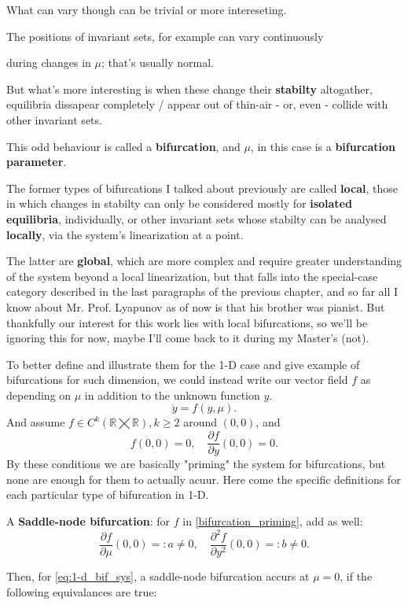 What can vary though can be trivial or more intereseting.

The positions of invariant sets, for example can vary continuously

during changes in $\mu$; that's usually normal.

But what's more interesting is when these change their \textbf{stabilty} altogather, equilibria dissapear completely / appear out of thin-air - or, even - collide with other invariant sets.

This odd behaviour is called a \textbf{bifurcation}, and $\mu$, in this case is a \textbf{bifurcation parameter}.

The former types of bifurcations I talked about previously are called \textbf{local}, those in which changes in stabilty can only be considered mostly for \textbf{isolated equilibria}, individually, or other invariant sets whose stabilty can be analysed \textbf{locally}, via the system's linearization at a point.

The latter are \textbf{global}, which are more complex and require greater understanding of the system beyond a local linearization, but that falls into the special-case category described in the last paragraphs of the previous chapter, and so far all I know about Mr. Prof. Lyapunov as of now is that his brother was pianist. But thankfully our interest for this work lies with local bifurcations, so we'll be ignoring this for now, maybe I'll come back to it during my Master's (not).

To better define and illustrate them for the 1-D case and give example of bifurcations for such dimension, we could instead write our vector field $f$ as depending on $\mu$ in addition to the unknown function $y$.
\begin{equation}\label{eq:1-d_bif_sys}
  \dot{y} = f(y, \mu).
\end{equation}
And assume $f \in C^k(\mathbb{R} \bigtimes \mathbb{R}), k \geq 2 $ around $(0,0)$, and
\begin{equation}\label{bifurcation_priming}
  f(0,0) = 0, \quad \frac{\partial f}{\partial y}(0,0) = 0.
\end{equation}
By these conditions we are basically "priming" the system for bifurcations, but none are enough for them to actually acuur. Here come the specific definitions for each particular type of bifurcation in 1-D.

\begin{definition}
  A \textbf{Saddle-node bifurcation}:
  for $f$ in \ref{bifurcation_priming}, add as well:
  \begin{equation*}
    \frac{\partial f}{\partial \mu}(0,0) =: a \neq 0, \quad \frac{\partial^2 f}{\partial y^2}(0,0) =:b \neq 0.
  \end{equation*}
\end{definition}
Then, for \ref{eq:1-d_bif_sys}, a saddle-node bifurcation accurs at $\mu = 0$, if the following equivalances are true:

